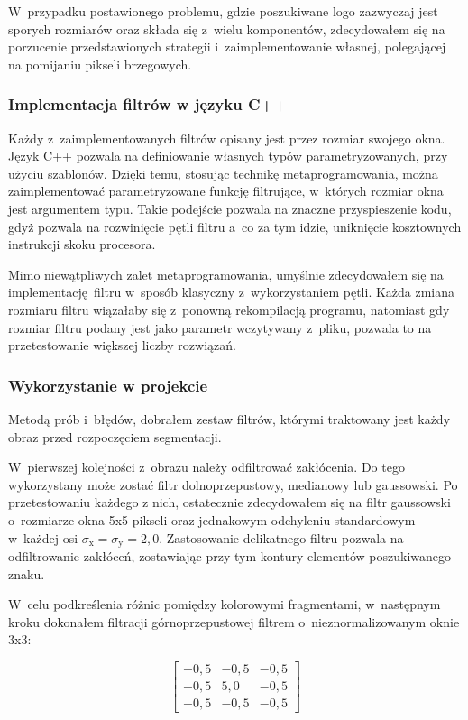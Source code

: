 W~przypadku postawionego problemu, gdzie poszukiwane logo zazwyczaj jest sporych rozmiarów oraz składa się z~wielu komponentów, zdecydowałem się na porzucenie przedstawionych strategii i~zaimplementowanie własnej, polegającej na pomijaniu pikseli brzegowych.

\subsubsection{Implementacja filtrów w języku C++}
Każdy z~zaimplementowanych filtrów opisany jest przez rozmiar swojego okna. Język C++ pozwala na definiowanie własnych typów parametryzowanych, przy użyciu szablonów. Dzięki temu, stosując technikę metaprogramowania, można zaimplementować parametryzowane funkcję filtrujące, w~których rozmiar okna jest argumentem typu. Takie podejście pozwala na znaczne przyspieszenie kodu, gdyż pozwala na rozwinięcie pętli filtru a~co za tym idzie, uniknięcie kosztownych instrukcji skoku procesora. 

Mimo niewątpliwych zalet metaprogramowania, umyślnie zdecydowałem się na implementację filtru w~sposób klasyczny z~wykorzystaniem pętli. Każda zmiana rozmiaru filtru wiązałaby się z~ponowną rekompilacją programu, natomiast gdy rozmiar filtru podany jest jako parametr wczytywany z~pliku, pozwala to na przetestowanie większej liczby rozwiązań. 

\subsubsection{Wykorzystanie w projekcie}
Metodą prób i~błędów, dobrałem zestaw filtrów, którymi traktowany jest każdy obraz przed rozpoczęciem segmentacji. 

W~pierwszej kolejności z~obrazu należy odfiltrować zakłócenia. Do tego wykorzystany może zostać filtr dolnoprzepustowy, medianowy lub gaussowski. Po przetestowaniu każdego z nich, ostatecznie zdecydowałem się na filtr gaussowski o~rozmiarze okna 5x5 pikseli oraz jednakowym odchyleniu standardowym w~każdej osi $\sigma_{\mathrm{x}} = \sigma_{\mathrm{y}} = 2{,}0$. Zastosowanie delikatnego filtru pozwala na odfiltrowanie zakłóceń, zostawiając przy tym kontury elementów poszukiwanego znaku. 

W~celu podkreślenia różnic pomiędzy kolorowymi fragmentami, w~następnym kroku dokonałem filtracji górnoprzepustowej filtrem o~nieznormalizowanym oknie 3x3:

$$
\begin{bmatrix}
    -0{,}5 & -0{,}5 & -0{,}5 \\
    -0{,}5 &  5{,}0 & -0{,}5 \\
    -0{,}5 & -0{,}5 & -0{,}5 
\end{bmatrix}
$$

